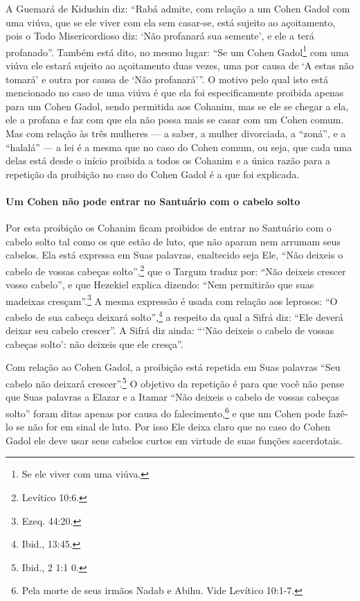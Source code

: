 A Guemará de Kidushin diz: ``Rabá admite, com relação a um Cohen
Gadol com uma viúva, que se ele viver com ela sem casar-se, está
sujeito ao açoitamento, pois o Todo Misericordioso diz: `Não profanará
sua semente', e ele a terá profanado''. Também está dito, no mesmo
lugar: ``Se um Cohen Gadol\footnote{Se ele viver com uma viúva.} com uma viúva ele estará sujeito ao açoitamento duas vezes, uma por causa de `A estas não
tomará' e outra por causa de `Não profanará'''. O motivo pelo qual isto
está mencionado no caso de uma viúva é que ela foi especificamente
proibida apenas para um Cohen Gadol, sendo permitida aos
Cohanim, mas se ele se chegar a ela, ele a profana e faz com que
ela não possa mais se casar com um Cohen comum. Mas com relação às
três mulheres --- a saber, a mulher divorciada, a ``zoná'', e a ``halalá'' --- a lei é a mesma que no caso do Cohen comum, ou seja, que cada uma delas está desde o
início proibida a todos os Cohanim e a única razão para a repetição
da proibição no caso do Cohen Gadol é a que foi explicada.

\paragraph{Um Cohen não pode entrar no Santuário com o cabelo solto}

Por esta proibição os Cohanim ficam proibidos de entrar no Santuário
com o cabelo solto tal como os que estão de luto, que não aparam nem
arrumam seus cabelos. Ela está expressa em Suas palavras, enaltecido
seja Ele, ``Não deixeis o cabelo de vossas cabeças solto'',\footnote{Levítico
10:6.} que o Targum traduz por: ``Não deixeis crescer vosso cabelo'', e
que Hezekiel explica dizendo: ``Nem permitirão que suas madeixas
cresçam''.\footnote{Ezeq. 44:20.} A mesma expressão é usada com relação
aos leprosos: ``O cabelo de sua cabeça deixará solto'',\footnote{Ibid., 13:45.} a
respeito da qual a Sifrá diz: ``Ele deverá deixar seu cabelo crescer''.
A Sifrá diz ainda: ```Não deixeis o cabelo de vossas cabeças solto': não
deixeis que ele cresça''.

Com relação ao Cohen Gadol, a proibição está repetida em Suas
palavras ``Seu cabelo não deixará crescer''.\footnote{Ibid., 2 1:1 0.} O objetivo
da repetição é para que você não pense que Suas palavras a Elazar e a
Itamar ``Não deixeis o cabelo de vossas cabeças solto'' foram ditas
apenas por causa do falecimento,\footnote{Pela morte de seus irmãos Nadab e Abihu. Vide Levítico 10:1-7.} e que um
Cohen pode fazê-lo se não for em sinal de luto. Por isso Ele deixa
claro que no caso do Cohen Gadol ele deve usar seus cabelos curtos
em virtude de suas funções sacerdotais.


